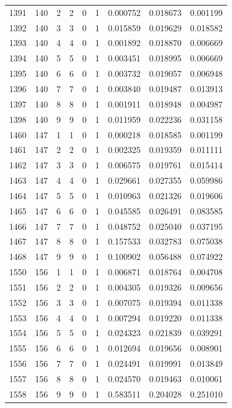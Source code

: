 \begin{longtable}{rrrrrrrrr}
1391 & 140 & 2 & 2 & 0 & 1 & 0.000752 & 0.018673 & 0.001199 \\
1392 & 140 & 3 & 3 & 0 & 1 & 0.015859 & 0.019629 & 0.018582 \\
1393 & 140 & 4 & 4 & 0 & 1 & 0.001892 & 0.018870 & 0.006669 \\
1394 & 140 & 5 & 5 & 0 & 1 & 0.003451 & 0.018995 & 0.006669 \\
1395 & 140 & 6 & 6 & 0 & 1 & 0.003732 & 0.019057 & 0.006948 \\
1396 & 140 & 7 & 7 & 0 & 1 & 0.003840 & 0.019487 & 0.013913 \\
1397 & 140 & 8 & 8 & 0 & 1 & 0.001911 & 0.018948 & 0.004987 \\
1398 & 140 & 9 & 9 & 0 & 1 & 0.011959 & 0.022236 & 0.031158 \\
1460 & 147 & 1 & 1 & 0 & 1 & 0.000218 & 0.018585 & 0.001199 \\
1461 & 147 & 2 & 2 & 0 & 1 & 0.002325 & 0.019359 & 0.011111 \\
1462 & 147 & 3 & 3 & 0 & 1 & 0.006575 & 0.019761 & 0.015414 \\
1463 & 147 & 4 & 4 & 0 & 1 & 0.029661 & 0.027355 & 0.059986 \\
1464 & 147 & 5 & 5 & 0 & 1 & 0.010963 & 0.021326 & 0.019606 \\
1465 & 147 & 6 & 6 & 0 & 1 & 0.045585 & 0.026491 & 0.083585 \\
1466 & 147 & 7 & 7 & 0 & 1 & 0.048752 & 0.025040 & 0.037195 \\
1467 & 147 & 8 & 8 & 0 & 1 & 0.157533 & 0.032783 & 0.075038 \\
1468 & 147 & 9 & 9 & 0 & 1 & 0.100902 & 0.056488 & 0.074922 \\
1550 & 156 & 1 & 1 & 0 & 1 & 0.006871 & 0.018764 & 0.004708 \\
1551 & 156 & 2 & 2 & 0 & 1 & 0.004305 & 0.019326 & 0.009656 \\
1552 & 156 & 3 & 3 & 0 & 1 & 0.007075 & 0.019394 & 0.011338 \\
1553 & 156 & 4 & 4 & 0 & 1 & 0.007294 & 0.019220 & 0.011338 \\
1554 & 156 & 5 & 5 & 0 & 1 & 0.024323 & 0.021839 & 0.039291 \\
1555 & 156 & 6 & 6 & 0 & 1 & 0.012694 & 0.019656 & 0.008901 \\
1556 & 156 & 7 & 7 & 0 & 1 & 0.024491 & 0.019991 & 0.013849 \\
1557 & 156 & 8 & 8 & 0 & 1 & 0.024570 & 0.019463 & 0.010061 \\
1558 & 156 & 9 & 9 & 0 & 1 & 0.583511 & 0.204028 & 0.251010 \\

\end{longtable}

